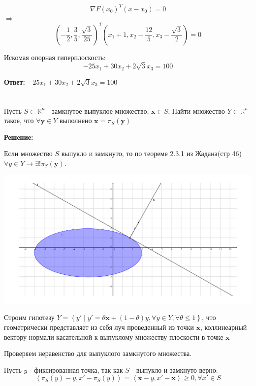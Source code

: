 \documentclass[a4paper,12pt]{article}
\newcommand{\lt}{\left}
\newcommand{\rt}{\right}
\begin{document}
$$ \nabla F(x_0)^T(x-x_0) = 0$$
$\Longrightarrow$ $$\lt(-\frac{1}{2}, \frac{3}{5},\frac{\sqrt{3}}{25}\rt)^T\lt(x_1+1, x_2-\frac{12}{5}, x_3-\frac{\sqrt{3}}{2}\rt) = 0$$

Искомая опорная гиперплоскость:
$$-25x_1 + 30x_2+2\sqrt{3}x_3 = 100$$


\textbf{Ответ:} $-25x_1 + 30x_2+2\sqrt{3}x_3 = 100$

\section{}

Пусть $S \subset \mathbb{R}^n$ - замкнутое выпуклое множество, $\mathbf{x} \in S$. Найти множество $Y \subset \mathbb{R}^n$ такое, что $\forall \mathbf{y} \in Y$ выполнено $\mathbf{x} = \pi_S(\mathbf{y})$

\vspace{\baselineskip}

\textbf{Решение:}

\vspace{\baselineskip}

Если множество $S$ выпукло и замкнуто, то по теореме 2.3.1 из Жадана(стр 46) $\forall y\in Y \rightarrow \exists! \pi_S(\mathbf{y})$. 

\includegraphics[width=\textwidth]{image2.pdf}

Строим гипотезу $Y = \lt\{y' \mid y' = \theta \mathbf{x} + (1-\theta)y, \forall y \in Y, \forall \theta \leq 1  \rt\}$, что геометрически представляет из себя луч проведенный из точки $\mathbf{x}$, коллинеарный вектору нормали касательной к выпуклому множеству плоскости в точке $\mathbf{x}$

Проверяем неравенство для выпуклого замкнутого множества.

Пусть $y$ - фиксированная точка, так как $S$ - выпукло и замкнуто верно:
$$ \lt\langle{\pi_S(y) - y, x' - \pi_S(y)}\rt\rangle = \lt\langle{\mathbf{x} - y, x' - \mathbf{x}}\rt\rangle \ge 0,  \forall x' \in S$$
\end{document}
